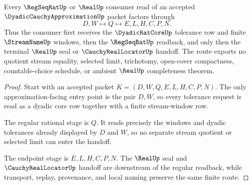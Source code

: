 \begin{theorem}
\label{thm:dyadic-cauchy-approximation-regseqrat-handoff}
Every $\RegSeqRatUp$ or $\RealUp$ consumer read of an accepted $\DyadicCauchyApproximationUp$ packet factors through
$$
D,W \longmapsto Q \longmapsto E,L,H,C,P,N .
$$
Thus the consumer first receives the $\DyadicRatCoreUp$ tolerance row and finite $\StreamNameUp$ windows, then the $\RegSeqRatUp$ readback, and only then the terminal $\RealUp$ seal or $\CauchyRealLocatorUp$ handoff. The route exports no quotient stream equality, selected limit, trichotomy, open-cover compactness, countable-choice schedule, or ambient $\RealUp$ completeness theorem.
\end{theorem}
\begin{proof}
Start with an accepted packet $K=(D,W,Q,E,L,H,C,P,N)$. The only approximation-facing entry point is the pair $D,W$, so every tolerance request is read as a dyadic core row together with a finite stream-window row.

The regular rational stage is $Q$. It reads precisely the windows and dyadic tolerances already displayed by $D$ and $W$, so no separate stream quotient or selected limit can enter the handoff.

The endpoint stage is $E,L,H,C,P,N$. The $\RealUp$ seal and $\CauchyRealLocatorUp$ handoff are downstream of the regular readback, while transport, replay, provenance, and local naming preserve the same finite route.
\end{proof}

